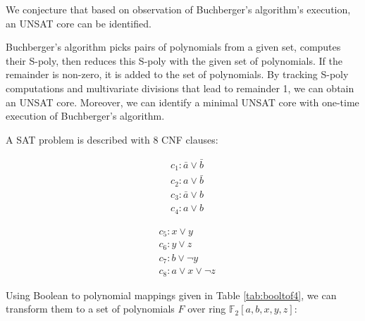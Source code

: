 We  conjecture that based on observation of Buchberger's algorithm's execution, an UNSAT core can be identified.
\begin{Conjecture}
Buchberger's algorithm picks pairs of polynomials from a given set, computes their S-poly, then reduces this S-poly
with the given set of polynomials. If the remainder is non-zero,
it is added to the set of polynomials.
By tracking S-poly computations and multivariate divisions that lead to remainder 
1, we can obtain an UNSAT core. Moreover, we can identify a minimal UNSAT core with one-time
 execution of Buchberger's algorithm.
\end{Conjecture}
\begin{Example}
A SAT problem is described with 8 CNF clauses:

\begin{minipage}[h]{0.3\textwidth}
\begin{align*}
&c_1: \bar{a}\lor\bar{b}\\
&c_2: a\lor\bar{b}\\
&c_3: \bar{a}\lor b\\
&c_4: a\lor b
\end{align*}
\end{minipage}
\begin{minipage}[h]{0.7\textwidth}
\begin{align*}
&c_5: x\lor y\\
&c_6: y\lor z\\
&c_7: b\lor \neg y\\
&c_8: a\lor x\lor \neg z
\end{align*}
\end{minipage}

Using Boolean to polynomial mappings given in Table \ref{tab:booltof4}, we can transform them to a set of
polynomials $F$ over ring $\mathbb F_2[a,b,x,y,z]$:


\end{Example}
